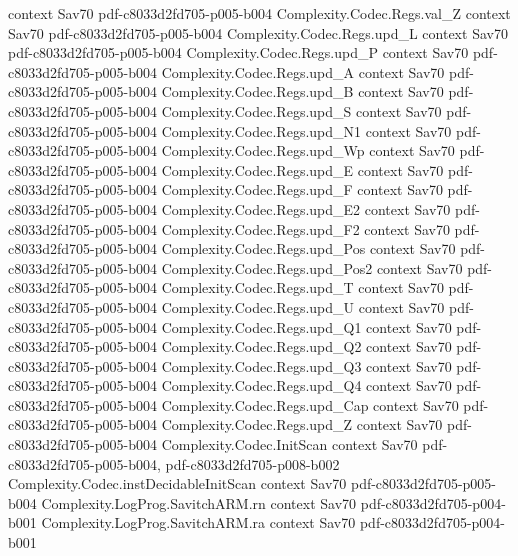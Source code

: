 \begin{theorem}
  {context}
  {Sav70}
  {pdf-c8033d2fd705-p005-b004}
\proofstep
  {Complexity.Codec.Regs.val_Z}
  {context}
  {Sav70}
  {pdf-c8033d2fd705-p005-b004}
\proofstep
  {Complexity.Codec.Regs.upd_L}
  {context}
  {Sav70}
  {pdf-c8033d2fd705-p005-b004}
\proofstep
  {Complexity.Codec.Regs.upd_P}
  {context}
  {Sav70}
  {pdf-c8033d2fd705-p005-b004}
\proofstep
  {Complexity.Codec.Regs.upd_A}
  {context}
  {Sav70}
  {pdf-c8033d2fd705-p005-b004}
\proofstep
  {Complexity.Codec.Regs.upd_B}
  {context}
  {Sav70}
  {pdf-c8033d2fd705-p005-b004}
\proofstep
  {Complexity.Codec.Regs.upd_S}
  {context}
  {Sav70}
  {pdf-c8033d2fd705-p005-b004}
\proofstep
  {Complexity.Codec.Regs.upd_N1}
  {context}
  {Sav70}
  {pdf-c8033d2fd705-p005-b004}
\proofstep
  {Complexity.Codec.Regs.upd_Wp}
  {context}
  {Sav70}
  {pdf-c8033d2fd705-p005-b004}
\proofstep
  {Complexity.Codec.Regs.upd_E}
  {context}
  {Sav70}
  {pdf-c8033d2fd705-p005-b004}
\proofstep
  {Complexity.Codec.Regs.upd_F}
  {context}
  {Sav70}
  {pdf-c8033d2fd705-p005-b004}
\proofstep
  {Complexity.Codec.Regs.upd_E2}
  {context}
  {Sav70}
  {pdf-c8033d2fd705-p005-b004}
\proofstep
  {Complexity.Codec.Regs.upd_F2}
  {context}
  {Sav70}
  {pdf-c8033d2fd705-p005-b004}
\proofstep
  {Complexity.Codec.Regs.upd_Pos}
  {context}
  {Sav70}
  {pdf-c8033d2fd705-p005-b004}
\proofstep
  {Complexity.Codec.Regs.upd_Pos2}
  {context}
  {Sav70}
  {pdf-c8033d2fd705-p005-b004}
\proofstep
  {Complexity.Codec.Regs.upd_T}
  {context}
  {Sav70}
  {pdf-c8033d2fd705-p005-b004}
\proofstep
  {Complexity.Codec.Regs.upd_U}
  {context}
  {Sav70}
  {pdf-c8033d2fd705-p005-b004}
\proofstep
  {Complexity.Codec.Regs.upd_Q1}
  {context}
  {Sav70}
  {pdf-c8033d2fd705-p005-b004}
\proofstep
  {Complexity.Codec.Regs.upd_Q2}
  {context}
  {Sav70}
  {pdf-c8033d2fd705-p005-b004}
\proofstep
  {Complexity.Codec.Regs.upd_Q3}
  {context}
  {Sav70}
  {pdf-c8033d2fd705-p005-b004}
\proofstep
  {Complexity.Codec.Regs.upd_Q4}
  {context}
  {Sav70}
  {pdf-c8033d2fd705-p005-b004}
\proofstep
  {Complexity.Codec.Regs.upd_Cap}
  {context}
  {Sav70}
  {pdf-c8033d2fd705-p005-b004}
\proofstep
  {Complexity.Codec.Regs.upd_Z}
  {context}
  {Sav70}
  {pdf-c8033d2fd705-p005-b004}
\proofstep
  {Complexity.Codec.InitScan}
  {context}
  {Sav70}
  {pdf-c8033d2fd705-p005-b004,
    pdf-c8033d2fd705-p008-b002}
\proofstep
  {Complexity.Codec.instDecidableInitScan}
  {context}
  {Sav70}
  {pdf-c8033d2fd705-p005-b004}
\proofstep
  {Complexity.LogProg.SavitchARM.rn}
  {context}
  {Sav70}
  {pdf-c8033d2fd705-p004-b001}
\proofstep
  {Complexity.LogProg.SavitchARM.ra}
  {context}
  {Sav70}
  {pdf-c8033d2fd705-p004-b001}

\end{theorem}
